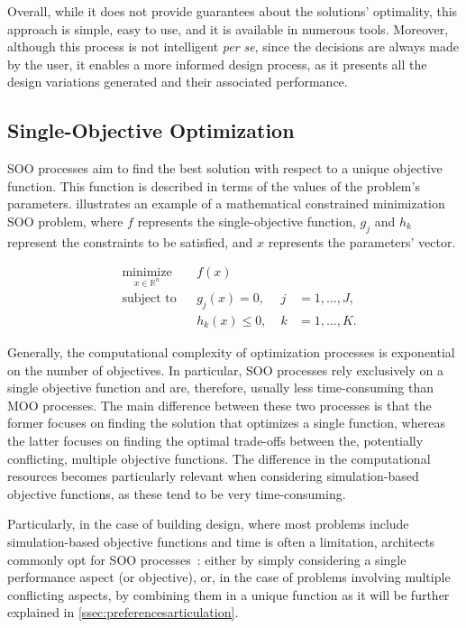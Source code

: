 	Overall, while it does not provide guarantees about the solutions’ optimality, this approach is simple, easy to use, and it is available in numerous tools. Moreover, although this process is not intelligent \textit{per se}, since the decisions are always made by the user, it enables a more informed design process, as it presents all the design variations generated and their associated performance.
	
	\subsection{Single-Objective Optimization}
	\label{ssec:soo}
	
	\ac{SOO} processes aim to find the best solution with respect to a unique objective function. This function is described in terms of the values of the problem's parameters.  illustrates an example of a mathematical constrained minimization \ac{SOO} problem, where $f$ represents the single-objective function, $g_j$ and $h_k$ represent the constraints to be satisfied, and $x$ represents the parameters' vector.
	
	\begin{equation} \label{eq:soo}
	\begin{aligned}
	& \underset{x \in \mathbb{R}^n}{\text{minimize}}
	& & f(x) \\
	& \text{subject to}
	& & g_j(x) = 0, & \; j &= 1, \ldots, J, \\ 
	&&& h_k(x) \leq 0, & \; k &= 1, \ldots, K.
	\end{aligned}
	\end{equation}
	
	Generally, the computational complexity of optimization processes is exponential on the number of objectives. In particular, \ac{SOO} processes rely exclusively on a single objective function and are, therefore, usually less time-consuming than \ac{MOO} processes. The main difference between these two processes is that the former focuses on finding the solution that optimizes a single function, whereas the latter focuses on finding the optimal trade-offs between the, potentially conflicting, multiple objective functions. The difference in the computational resources becomes particularly relevant when considering simulation-based objective functions, as these tend to be very time-consuming. 
	
	Particularly, in the case of building design, where most problems include simulation-based objective functions and time is often a limitation, architects commonly opt for \ac{SOO} processes~\cite{Wortmann2017Opossum}: either by simply considering a single performance aspect (or objective), or, in the case of problems involving multiple conflicting aspects, by combining them in a unique function as it will be further explained in \cref{ssec:preferencesarticulation}.
		
